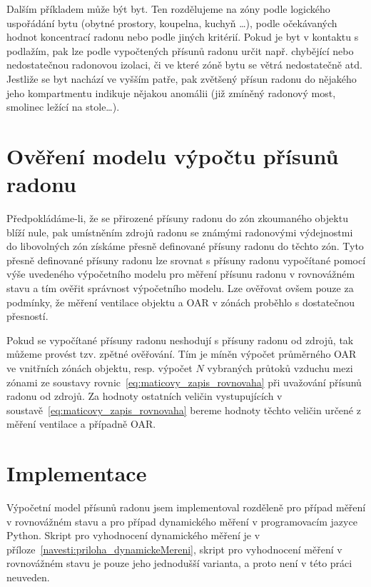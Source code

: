 Dalším příkladem může být byt. Ten rozdělujeme na zóny podle logického uspořádání bytu (obytné prostory, koupelna, kuchyň \ldots), podle očekávaných hodnot koncentrací radonu nebo podle jiných kritérií.
Pokud je byt v kontaktu s podlažím, pak lze podle vypočtených přísunů radonu určit např. chybějící nebo nedostatečnou radonovou izolaci, či ve které zóně bytu se větrá nedostatečně atd. Jestliže se byt nachází ve vyšším patře, pak zvětšený přísun radonu do nějakého jeho kompartmentu indikuje nějakou anomálii (již zmíněný radonový most, smolinec ležící na stole\ldots).


\section{Ověření modelu výpočtu přísunů radonu}
Předpokládáme-li, že se přirozené přísuny radonu do zón zkoumaného objektu blíží nule, pak umístněním zdrojů radonu se známými radonovými výdejnostmi do libovolných zón získáme přesně definované přísuny radonu do těchto zón. Tyto přesně definované přísuny radonu lze srovnat s přísuny radonu vypočítané pomocí výše uvedeného výpočetního modelu pro měření přísunu radonu v rovnovážném stavu a tím ověřit správnost výpočetního modelu. Lze ověřovat ovšem pouze za podmínky, že měření ventilace objektu a OAR v zónách proběhlo s dostatečnou přesností.

Pokud se vypočítané přísuny radonu neshodují s přísuny radonu od zdrojů, tak můžeme provést tzv. zpětné ověřování. Tím je míněn výpočet průměrného OAR ve vnitřních zónách objektu, resp. výpočet $N$ vybraných průtoků vzduchu mezi zónami ze soustavy rovnic~\eqref{eq:maticovy_zapis_rovnovaha} při uvažování přísunů radonu od zdrojů. Za hodnoty ostatních veličin vystupujících v soustavě~\eqref{eq:maticovy_zapis_rovnovaha} bereme hodnoty těchto veličin určené z měření ventilace a případně OAR.

\section{Implementace}
Výpočetní model přísunů radonu jsem implementoval rozděleně pro případ měření v rovnovážném stavu a pro případ dynamického měření v programovacím jazyce Python. Skript pro vyhodnocení dynamického měření je v příloze~\ref{navesti:priloha_dynamickeMereni}, skript pro vyhodnocení měření v rovnovážném stavu je pouze jeho jednodušší varianta, a proto není v této práci neuveden.

